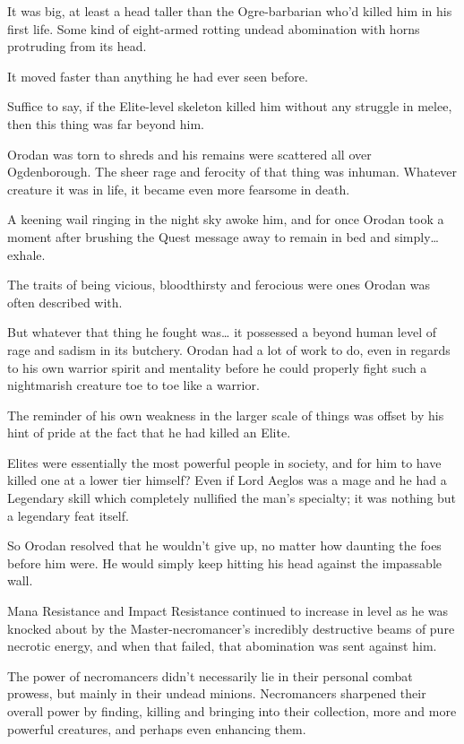 \documentclass[a4paper,10pt]{book}
\begin{document}
It was big, at least a head taller than the Ogre-barbarian who’d killed him in his first life. Some kind of eight-armed rotting undead abomination with horns protruding from its head.\par
It moved faster than anything he had ever seen before.\par
Suffice to say, if the Elite-level skeleton killed him without any struggle in melee, then this thing was far beyond him.\par
Orodan was torn to shreds and his remains were scattered all over Ogdenborough. The sheer rage and ferocity of that thing was inhuman. Whatever creature it was in life, it became even more fearsome in death.\par
A keening wail ringing in the night sky awoke him, and for once Orodan took a moment after brushing the Quest message away to remain in bed and simply… exhale.\par
The traits of being vicious, bloodthirsty and ferocious were ones Orodan was often described with.\par
But whatever that thing he fought was… it possessed a beyond human level of rage and sadism in its butchery. Orodan had a lot of work to do, even in regards to his own warrior spirit and mentality before he could properly fight such a nightmarish creature toe to toe like a warrior.\par
The reminder of his own weakness in the larger scale of things was offset by his hint of pride at the fact that he had killed an Elite.\par
Elites were essentially the most powerful people in society, and for him to have killed one at a lower tier himself? Even if Lord Aeglos was a mage and he had a Legendary skill which completely nullified the man’s specialty; it was nothing but a legendary feat itself.\par
So Orodan resolved that he wouldn’t give up, no matter how daunting the foes before him were. He would simply keep hitting his head against the impassable wall.\par
\par
Mana Resistance and Impact Resistance continued to increase in level as he was knocked about by the Master-necromancer’s incredibly destructive beams of pure necrotic energy, and when that failed, that abomination was sent against him.\par
The power of necromancers didn’t necessarily lie in their personal combat prowess, but mainly in their undead minions. Necromancers sharpened their overall power by finding, killing and bringing into their collection, more and more powerful creatures, and perhaps even enhancing them.\par
\end{document}
